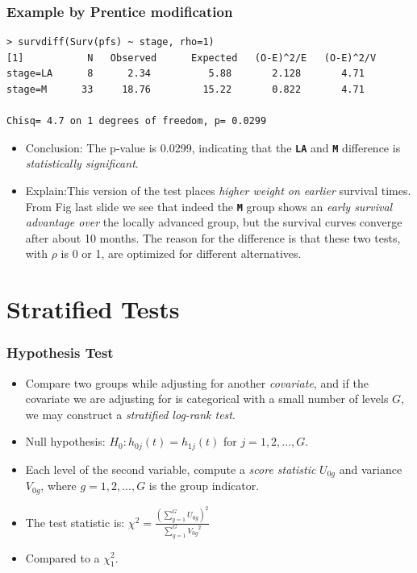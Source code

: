 \documentclass{beamer}
\newcommand{\empr}[1]{{\emph{\color{red}#1}}}
\newcommand{\pkg}[1]{{\textbf{\texttt{#1}}}}
\begin{document}
\pagebreak
\begin{frame}[fragile]
\frametitle{Example by Prentice modification}
\begin{Verbatim}
> survdiff(Surv(pfs) ~ stage, rho=1)
[1]           N   Observed      Expected   (O-E)^2/E   (O-E)^2/V
stage=LA      8      2.34          5.88       2.128       4.71
stage=M      33     18.76         15.22       0.822       4.71

Chisq= 4.7 on 1 degrees of freedom, p= 0.0299
\end{Verbatim}
\begin{itemize}
\item Conclusion: The p-value is 0.0299, indicating that the \pkg{LA} and \pkg{M} difference is \empr{ statistically significant}.
\item Explain:This version of the test places \empr{higher weight on earlier} survival times. From Fig last slide we see that indeed the \pkg{M} group shows an \empr{early survival advantage over} the locally advanced group, but the survival curves converge after about 10 months. The reason for the difference is that these two tests, with $\rho$ is 0 or 1, are optimized for different alternatives.
\end{itemize}
\end{frame}

\section{Stratified Tests}
\begin{frame}
\frametitle{Hypothesis Test}
\begin{itemize}
\item Compare two groups while adjusting for another \empr{covariate}, and if the covariate we are adjusting for is categorical with {\color{red}a small number of levels $G$}, we may construct a \empr{stratified log-rank test}.
\item Null hypothesis: $H_0: h_{0j}(t)=h_{1j}(t)$ for $j = 1,2,...,G$.
\item Each level of the second variable, compute a \empr{score statistic} $U_{0g}$ and variance $V_{0g}$, where $g = 1,2,...,G$ is the group indicator.
\item The test statistic is: 
${\chi}^2 = \frac{(\sum_{g=1}^{G}U_{0g})^2}{\sum_{g=1}^{G}{V_{0g}}^2}$
\item Compared to a $\chi _{1}^{2}$.
\end{itemize}
\end{frame}
\end{document}
